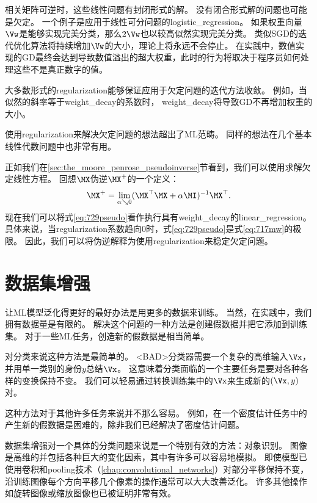相关矩阵可逆时，这些线性问题有封闭形式的解。
没有闭合形式解的问题也可能是欠定。
一个例子是应用于线性可分问题的\gls{logistic_regression}。
如果权重向量$\Vw$是能够实现完美分类，那么$2 \Vw$也以较高似然实现完美分类。
类似\gls{SGD}的迭代优化算法将持续增加$\Vw$的大小，理论上将永远不会停止。
在实践中，数值实现的\gls{GD}最终会达到导致数值溢出的超大权重，此时的行为将取决于程序员如何处理这些不是真正数字的值。

大多数形式的\gls{regularization}能够保证应用于欠定问题的迭代方法收敛。
例如，当似然的斜率等于\gls{weight_decay}的系数时， \gls{weight_decay}将导致\gls{GD}不再增加权重的大小。

使用\gls{regularization}来解决欠定问题的想法超出了\gls{ML}范畴。
同样的想法在几个基本线性代数问题中也非常有用。


正如我们在\ref{sec:the_moore_penrose_pseudoinverse}节看到，我们可以使用求解欠定线性方程。 
回想$\MX$伪逆$\MX^+$的一个定义：
\begin{align} 
\label{eq:729pseudo}
 \MX^+ = \lim_{\alpha \searrow 0} (\MX^\top \MX + \alpha \MI)^{-1}\MX^\top.
\end{align}
现在我们可以将式\ref{eq:729pseudo}看作执行具有\gls{weight_decay}的\gls{linear_regression}。
具体来说，当\gls{regularization}系数趋向0时，式\ref{eq:729pseudo}是式\ref{eq:717mw}的极限。
因此，我们可以将伪逆解释为使用\gls{regularization}来稳定欠定问题。


\section{数据集增强}
\label{sec:dataset_augmentation}
让\gls{ML}模型泛化得更好的最好办法是用更多的数据来训练。
当然，在实践中，我们拥有数据量是有限的。
解决这个问题的一种方法是创建假数据并把它添加到训练集。
对于一些\gls{ML}任务，创造新的假数据是相当简单。

对分类来说这种方法是最简单的。
<BAD>分类器需要一个复杂的高维输入$\Vx$，并用单一类别的身份$y$总结$\Vx$。
这意味着分类面临的一个主要任务是要对各种各样的变换保持不变。
我们可以轻易通过转换训练集中的$\Vx$来生成新的$(\Vx, y)$对。

这种方法对于其他许多任务来说并不那么容易。
例如，在一个密度估计任务中的产生新的假数据是困难的，除非我们已经解决了密度估计问题。

数据集增强对一个具体的分类问题来说是一个特别有效的方法：对象识别。
图像是高维的并包括各种巨大的变化因素，其中有许多可以容易地模拟。
即使模型已使用卷积和\gls{pooling}技术（\ref{chap:convolutional_networks}）对部分平移保持不变，沿训练图像每个方向平移几个像素的操作通常可以大大改善泛化。
许多其他操作如旋转图像或缩放图像也已被证明非常有效。


